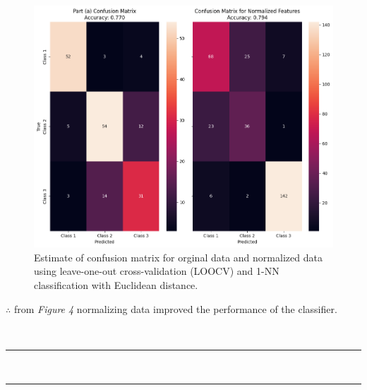 \documentclass{article}
\begin{document}
\begin{figure}[H]

\includegraphics[width=1\textwidth]{q10_c.png} 
\caption{Estimate of confusion matrix for orginal data and normalized data using leave-one-out cross-validation (LOOCV) and 1-NN classification with Euclidean distance.}

\end{figure}

\parbox{\textwidth}{$\therefore$ from \textit{Figure 4} normalizing data improved the performance of the classifier.}\\

\noindent\rule{\textwidth}{0.4pt}\\
\noindent\rule{\textwidth}{0.4pt}\\
\end{document}
